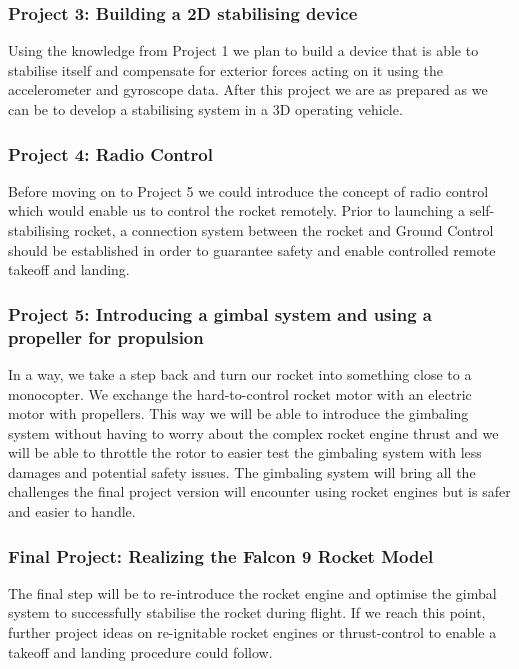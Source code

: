 \documentclass[a4paper,10pt]{article} %
\begin{document}
\subsubsection*{Project 3: Building a 2D stabilising device}
Using the knowledge from Project 1 we plan to build a device that is able
to stabilise itself and compensate for exterior forces acting on it using the
accelerometer and gyroscope data. After this project we are as prepared as we can be
to develop a stabilising system in a 3D operating vehicle.

\subsubsection*{Project 4: Radio Control}
Before moving on to Project 5 we could introduce the concept of radio
control which would enable us to control the rocket remotely. Prior to launching a self-stabilising
rocket, a connection system between the rocket and Ground Control should
be established in order to guarantee safety and enable controlled
remote takeoff and landing.

\newpage

\subsubsection*{Project 5: Introducing a gimbal system and using a propeller for propulsion}
In a way, we take a step back and turn our rocket into something close to a monocopter. We exchange the hard-to-control rocket motor with an electric motor with propellers. 
This way we will be able to introduce the gimbaling system without having to worry about the complex rocket engine
thrust and we will be able to throttle the rotor to easier test the
gimbaling system with less damages and potential safety issues. The
gimbaling system will bring all the challenges the final project version
will encounter using rocket engines but is safer and easier to handle.

\subsubsection*{Final Project: Realizing the Falcon 9 Rocket Model}
The final step will be to re-introduce the rocket engine and optimise the
gimbal system to successfully stabilise the rocket during flight. If we
reach this point, further project ideas on re-ignitable rocket engines
or thrust-control to enable a takeoff and landing procedure could
follow.
\end{document}
